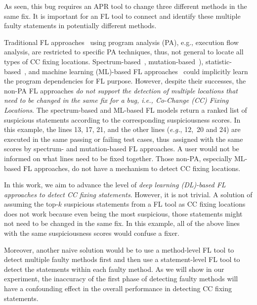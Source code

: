 
 As seen, this
bug requires an APR tool to change three different methods in the same fix.
It is important for an FL tool to connect and identify these multiple
faulty statements in potentially different methods.


Traditional FL approaches~\cite{zhang-fse09,ICICA-10} using program
analysis (PA), e.g., execution flow analysis, are restricted to
specific PA techniques, thus, not general to locate all types of CC
fixing locations.
Spectrum-based~\cite{jones2005empirical,abreu2006evaluation},
mutation-based~\cite{MUSE,papadakis2012using,Metallaxis}),
statistic-based~\cite{liblit-pldi05}, and machine learning (ML)-based
FL approaches~\cite{DeepFL,icse21-fl} could implicitly learn the
program dependencies for FL purpose. However, despite their successes,
the non-PA FL approaches {\em do not support the detection of multiple
  locations that need to be changed in the same fix for a bug, i.e.,
  Co-Change (CC) Fixing Locations}.
%
The spectrum-based and ML-based FL models return a ranked list of
suspicious statements according to the corresponding suspiciousness
scores. In this example, the lines 13, 17, 21, and the other lines
({\em e.g.}, 12,~20 and 24) are executed in the same passing or
failing test cases, thus~assigned with the same scores by
spectrum- and mutation-based FL approaches. A user would not be
informed on what lines need to be fixed together. Those non-PA,
especially ML-based FL approaches, do not have a mechanism to detect CC
fixing locations.

In this work, we aim to advance the level of {\em deep learning
  (DL)-based FL approaches to detect CC fixing statements}. However,
it is not trivial. A solution of assuming the top-$k$ suspicious
statements from a FL tool as CC fixing locations does not work because
even being the most suspicious, those statements might not need to be
changed in the same fix. In this example, all of the above lines with
the same suspiciousness scores would confuse a fixer.

Moreover, another naive solution would be to use a method-level FL
tool to detect multiple faulty methods first and then use a
statement-level FL tool to detect the statements within each faulty
method. As we will show in our experiment, the inaccuracy of the first
phase of detecting faulty methods will have a confounding effect in
the overall performance in detecting CC fixing statements.


